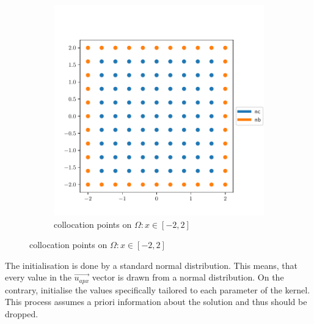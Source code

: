 \documentclass[./\jobname.tex]{subfiles}
\begin{document}
\begin{figure}[h]
\begin{subfigure}[b]{0.5\linewidth}
		\includegraphics[width=1\textwidth]{../img/pdf/testbed_big_domain.pdf}
		\caption{collocation points on $\Omega: x\in [-2,2]$}
		\label{fig:collocation_points_domain_big}
	\end{subfigure}%
	\label{fig:collocation_points}
\end{figure}

The initialisation is done by a standard normal distribution. This means, that every value in the $\vec{u_{apx}}$ vector is drawn from a normal distribution. On the contrary, \cite{chaquet_using_2019} initialise the values specifically tailored to each parameter of the kernel. This process assumes a priori information about the solution and thus should be dropped. 
\end{document}
